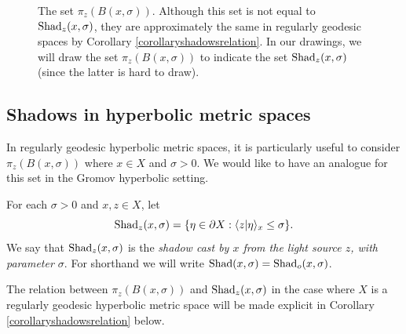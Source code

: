 \begin{figure}
\begin{center}
\caption[Shadows in regularly geodesic hyperbolic metric spaces]{The set $\pi_z(B(x,\sigma))$. Although this set is not equal to $\operatorname{Shad}_z(x,\sigma)$, they are approximately the same in regularly geodesic spaces by Corollary \ref{corollaryshadowsrelation}. In our drawings, we will draw the set $\pi_z(B(x,\sigma))$ to indicate the set $\operatorname{Shad}_z(x,\sigma)$ (since the latter is hard to draw).}
\label{figureshadow}
\end{center}
\end{figure}


\subsection{Shadows in hyperbolic metric spaces}
In regularly geodesic hyperbolic metric spaces, it is particularly useful to consider $\pi_z(B(x,\sigma))$ where $x\in X$ and $\sigma > 0$. We would like to have an analogue for this set in the Gromov hyperbolic setting.

\begin{definition}
\label{definitionshadow}
For each $\sigma > 0$ and $x,z\in X$, let
\[
\operatorname{Shad}_z(x,\sigma) = \{\eta\in \partial X:\langle z|\eta\rangle_x\leq\sigma\}.
\]
We say that $\operatorname{Shad}_z(x,\sigma)$ is the \emph{shadow cast by $x$ from the light source $z$, with parameter $\sigma$}. For shorthand we will write $\operatorname{Shad}(x,\sigma) = \operatorname{Shad}_o(x,\sigma)$.
\end{definition}
The relation between $\pi_z(B(x,\sigma))$ and $\operatorname{Shad}_z(x,\sigma)$ in the case where $X$ is a regularly geodesic hyperbolic metric space will be made explicit in Corollary \ref{corollaryshadowsrelation} below.


